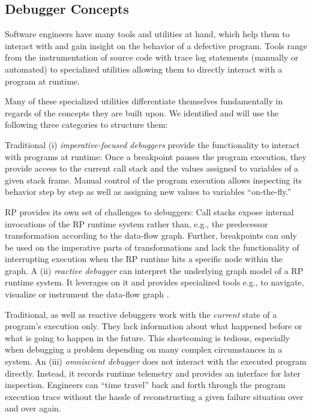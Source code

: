 \documentclass[sigplan,screen,review]{acmart}
\begin{document}
\subsection{Debugger Concepts}

Software engineers have many tools and utilities at hand, which help them to interact with and gain insight on the behavior of a defective program. Tools range from the instrumentation of source code with trace log statements (manually or automated) to specialized utilities allowing them to directly interact with a program at runtime.

Many of these specialized utilities differentiate themselves fundamentally in regards of the concepts they are built upon. We identified and will use the following three categories to structure them:

Traditional (i) \emph{imperative-focused debuggers} provide the functionality to interact with programs at runtime: Once a breakpoint pauses the program execution, they provide access to the current call stack and the values assigned to variables of a given stack frame. Manual control of the program execution allows inspecting its behavior step by step as well as assigning new values to variables ``on-the-fly.''

RP provides its own set of challenges to debuggers: Call stacks expose internal invocations of the RP runtime system rather than, e.g., the predecessor transformation according to the data-flow graph. Further, breakpoints can only be used on the imperative parts of transformations and lack the functionality of interrupting execution when the RP runtime hits a specific node within the graph. A (ii) \emph{reactive debugger} can interpret the underlying graph model of a RP runtime system. It leverages on it and provides specialized tools e.g., to navigate, visualize or instrument the data-flow graph \cite{10.1145/2884781.2884815} \cite{10.1145/3180155.3180156} \cite{rxviz}.

Traditional, as well as reactive debuggers work with the \emph{current} state of a program's execution only. They lack information about what happened before or what is going to happen in the future. This shortcoming is tedious, especially when debugging a problem depending on many complex circumstances in a system. An (iii) \emph{omniscient debugger} \cite{5287015} \cite{DBLP:journals/corr/OCallahanJFHNP17} does not interact with the executed program directly. Instead, it records runtime telemetry and provides an interface for later inspection. Engineers can ``time travel'' back and forth through the program execution trace without the hassle of reconstructing a given failure situation over and over again.
\end{document}
